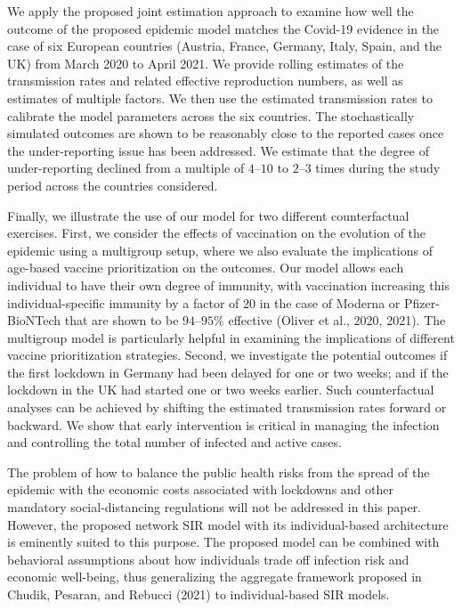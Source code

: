 \documentclass[12pt]{article}
\begin{document}
We apply the proposed joint estimation approach to examine how well the
outcome of the proposed epidemic model matches the Covid-19 evidence in the
case of six European countries (Austria, France, Germany, Italy, Spain, and
the UK) from March 2020 to April 2021. We provide rolling estimates of the
transmission rates and related effective reproduction numbers, as well as
estimates of multiple factors. We then use the estimated transmission rates to
calibrate the model parameters across the six countries. The stochastically
simulated outcomes are shown to be reasonably close to the reported cases once
the under-reporting issue has been addressed. We estimate that the degree of
under-reporting declined from a multiple of $4$--$10$ to $2$--$3$ times during
the study period across the countries considered.

Finally, we illustrate the use of our model for two different counterfactual
exercises. First, we consider the effects of vaccination on the evolution of
the epidemic using a multigroup setup, where we also evaluate the implications
of age-based vaccine prioritization on the outcomes. Our model allows each
individual to have their own degree of immunity, with vaccination increasing
this individual-specific immunity by a factor of $20$ in the case of Moderna
or Pfizer-BioNTech that are shown to be $94$--$95\%$ effective (Oliver et al.,
2020, 2021). The multigroup model is particularly helpful in examining the
implications of different vaccine prioritization strategies. Second, we
investigate the potential outcomes if the first lockdown in Germany had been
delayed for one or two weeks; and if the lockdown in the UK had started one or
two weeks earlier. Such counterfactual analyses can be achieved by shifting
the estimated transmission rates forward or backward. We show that early
intervention is critical in managing the infection and controlling the total
number of infected and active cases.

The problem of how to balance the public health risks from the spread of the
epidemic with the economic costs associated with lockdowns and other mandatory
social-distancing regulations will not be addressed in this paper. However,
the proposed network SIR model with its individual-based architecture is
eminently suited to this purpose. The proposed model can be combined with
behavioral assumptions about how individuals trade off infection risk and
economic well-being, thus generalizing the aggregate framework proposed in
Chudik, Pesaran, and Rebucci (2021) to individual-based SIR models.
\end{document}
